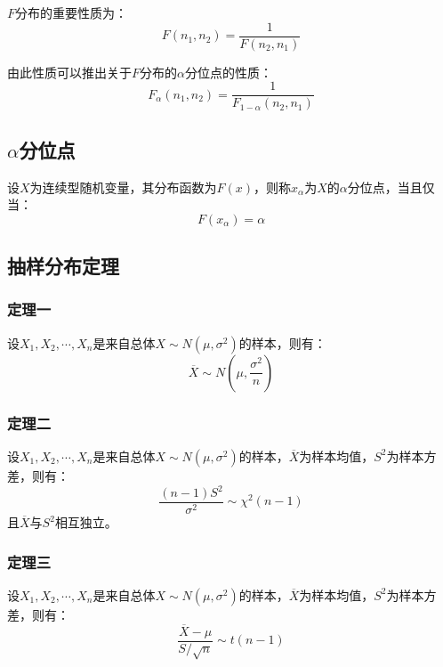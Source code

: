 \documentclass[a4paper,12pt]{ctexart}
\begin{document}
$F$分布的重要性质为：
\begin{equation*}
	F(n_1,n_2) = \frac{1}{F(n_2,n_1)}
\end{equation*}

由此性质可以推出关于$F$分布的$\alpha$分位点的性质：
\begin{equation*}
	F_{\alpha}(n_1,n_2) = \frac{1}{F_{1-\alpha}(n_2,n_1)}
\end{equation*}

\subsection{$\alpha$分位点}

设$X$为连续型随机变量，其分布函数为$F(x)$，则称$x_\alpha$为$X$的$\alpha$分位点，当且仅当：
\begin{equation*}
	F(x_\alpha) = \alpha
\end{equation*}

\subsection{抽样分布定理}

\subsubsection{定理一}

设$X_1,X_2,\cdots,X_n$是来自总体$X \sim N(\mu,\sigma^2)$的样本，则有：
\begin{equation*}
	\overline{X} \sim N\left(\mu,\frac{\sigma^2}{n}\right)
\end{equation*}

\subsubsection{定理二}

设$X_1,X_2,\cdots,X_n$是来自总体$X \sim N(\mu,\sigma^2)$的样本，$\overline{X}$为样本均值，$S^2$为样本方差，则有：
\begin{equation*}
	\frac{(n-1)S^2}{\sigma^2} \sim \chi^2(n-1)
\end{equation*}
且$\overline{X}$与$S^2$相互独立。

\subsubsection{定理三}

设$X_1,X_2,\cdots,X_n$是来自总体$X \sim N(\mu,\sigma^2)$的样本，$\overline{X}$为样本均值，$S^2$为样本方差，则有：
\begin{equation*}
	\frac{\overline{X} - \mu}{S/\sqrt{n}} \sim t(n-1)
\end{equation*}
\end{document}
